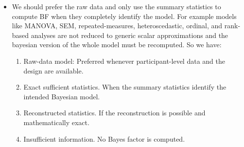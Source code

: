 \documentclass[11pt,a4paper]{article}
\begin{document}
\begin{itemize}
    \item We should prefer the raw data and only use the summary statistics to compute BF when they completely identify the model. For example models like MANOVA, SEM, repeated-measures, heteroscedastic, ordinal, and rank-based analyses are not reduced to generic scalar approximations and the bayesian version of the whole model must be recomputed. So we have:
    \begin{enumerate}
        \item Raw-data model: Preferred whenever participant-level data and the design are available.
        \item Exact sufficient statistics. When the summary statistics identify the intended Bayesian model.
        \item Reconstructed statistics. If the reconstruction is possible and mathematically exact.
        \item Insufficient information. No Bayes factor is computed.


\end{enumerate}
\end{itemize}
\end{document}
